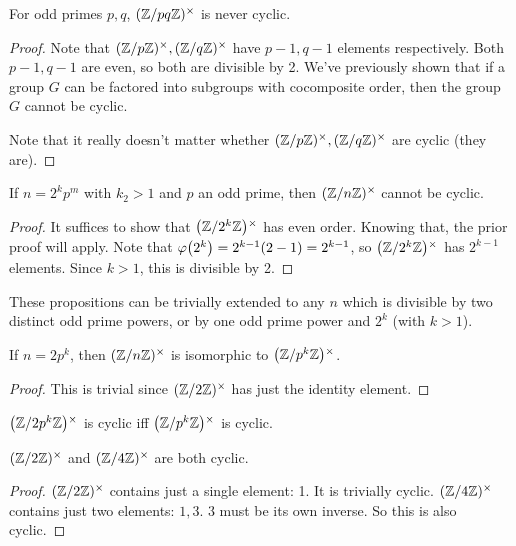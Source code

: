 \begin{proposition}
  For odd primes $p, q$, $\Zmodx{pq}$ is never cyclic.
\end{proposition}

\begin{proof}
  Note that $\Zmodx{p}, \Zmodx{q}$ have $p-1, q-1$ elements
  respectively. Both $p-1, q-1$ are even, so both are divisible by 2.
  We've previously shown that if a group $G$ can be factored into
  subgroups with cocomposite order, then the group $G$ cannot be cyclic.

  Note that it really doesn't matter whether $\Zmodx{p}, \Zmodx{q}$ are
  cyclic (they are).
\end{proof}

\begin{proposition}
  If $n = 2^k p^m$ with $k_2 > 1$ and $p$ an odd prime, then $\Zmodnx$
  cannot be cyclic.
\end{proposition}

\begin{proof}
  It suffices to show that $\Zmodx{2^k}$ has even order. Knowing that,
  the prior proof will apply. Note that $\vphif{2^k} = 2^{k-1}(2 - 1) =
  2^{k-1}$, so $\Zmodx{2^k}$ has $2^{k-1}$ elements. Since $k>1$, this
  is divisible by 2.
\end{proof}

\begin{remark}
  These propositions can be trivially extended to any $n$ which is
  divisible by two distinct odd prime powers, or by one odd prime power
  and $2^k$ (with $k > 1$).
\end{remark}

\begin{proposition}
  If $n = 2 p^k$, then $\Zmodnx$ is isomorphic to $\Zmodx{p^k}$.
\end{proposition}

\begin{proof}
  This is trivial since $\Zmodx{2}$ has just the identity element.
\end{proof}

\begin{corollary}
  $\Zmodx{2 p^k}$ is cyclic iff $\Zmodx{p^k}$ is cyclic.
\end{corollary}

\begin{proposition}
  $\Zmodx{2}$ and $\Zmodx{4}$ are both cyclic.
\end{proposition}

\begin{proof}
  $\Zmodx{2}$ contains just a single element: 1. It is trivially cyclic.
  $\Zmodx{4}$ contains just two elements: $1, 3$. $3$ must be its own
  inverse. So this is also cyclic.
\end{proof}

